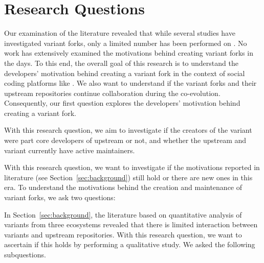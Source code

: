 \section{Research Questions}
\label{sec:rqs}

Our examination of the literature revealed that while several
studies have investigated variant forks, only a limited number has been performed on \gh.
No work has extensively examined the motivations behind creating variant forks in the \gh days.
To this end, the overall goal of this research is to understand the developers' motivation behind creating a variant fork in the context of social coding platforms like \gh. We also want to understand if the variant forks and their upstream repositories continue collaboration during the co-evolution. 
Consequently, our first question explores the developers' motivation behind creating a variant fork.

\nd  \textbf{\rqOne} With this research question, we aim to investigate if the creators of the variant were part core developers of upstream or not, and whether the upstream and variant currently have active maintainers.

\nd  \emph{\rqOneOne}

\nd \emph{\rqOneTwo}

\nd \textbf{\rqTwo} With this research question, we want to investigate if the motivations reported in literature (see Section~\ref{sec:background}) still hold or there are new ones in this \gh era.
To understand the motivations behind the creation and maintenance of variant forks, we ask two questions:

\nd \textit{\rqTwoOne} 

\nd  \textit{\rqTwoTwo} 

\nd  \textit{\rqTwoThree}

\nd \textbf{\rqThree} In Section~\ref{sec:background}, the literature based on quantitative analysis of variants from three ecosystems revealed that there is limited interaction between variants and upstream repositories. With this research question, we want to ascertain if this holds by performing a qualitative study. We asked the following subquestions.

\nd \textit{\rqThreeOne}

\nd \textit{\rqThreeTwo}
